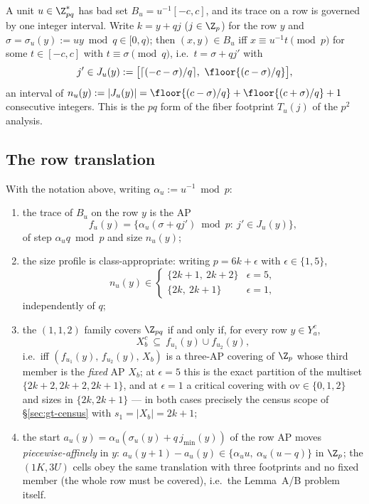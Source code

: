 A unit $u\in\Z_{pq}^{*}$ has bad set $B_u=u^{-1}[-c,c]$, and its trace on a
row is governed by one integer interval. Write $k=y+qj$ ($j\in\Z_p$) for the
row $y$ and $\sigma=\sigma_u(y):=uy\bmod q\in[0,q)$; then
$(x,y)\in B_u$ iff $x\equiv u^{-1}t\pmod p$ for some $t\in[-c,c]$ with
$t\equiv\sigma\pmod q$, i.e.\ $t=\sigma+qj'$ with
\begin{equation}\label{eq:Jinterval}
j'\in J_u(y):=\bigl[\lceil(-c-\sigma)/q\rceil,\ \floor{(c-\sigma)/q}\bigr],
\end{equation}
an interval of $n_u(y):=|J_u(y)|=\floor{(c-\sigma)/q}+\floor{(c+\sigma)/q}+1$
consecutive integers. This is the $pq$ form of the fiber footprint
$T_u(j)$ of the $p^2$ analysis.

\subsection{The row translation}\label{sec:pq-thm}

\begin{theorem}[row translation at $N=pq$]\label{thm:R}
With the notation above, writing $\alpha_u:=u^{-1}\bmod p$:
\begin{enumerate}[leftmargin=1.9em,itemsep=2pt]
\item[\textup{(i)}] the trace of $B_u$ on the row $y$ is the AP
\[
f_u(y)=\{\alpha_u(\sigma+qj')\bmod p:\ j'\in J_u(y)\},
\]
of step $\alpha_u q\bmod p$ and size $n_u(y)$;
\item[\textup{(ii)}] the size profile is class-appropriate: writing
$p=6k+\epsilon$ with $\epsilon\in\{1,5\}$,
\[
n_u(y)\in
\begin{cases}
\{2k+1,\ 2k+2\}&\epsilon=5,\\
\{2k,\ 2k+1\}&\epsilon=1,
\end{cases}
\]
independently of $q$;
\item[\textup{(iii)}] the $(1,1,2)$ family covers $\Z_{pq}$ if and only if,
for every row $y\in Y_a^{c}$,
\[
X_b^{c}\ \subseteq\ f_{u_1}(y)\cup f_{u_2}(y),
\]
i.e.\ iff $(f_{u_1}(y),\,f_{u_2}(y),\,X_b)$ is a three-AP covering of
$\Z_p$ whose third member is the \emph{fixed} AP $X_b$; at $\epsilon=5$ this
is the exact partition of the multiset $\{2k{+}2,2k{+}2,2k{+}1\}$, and at
$\epsilon=1$ a critical covering with $\mathrm{ov}\in\{0,1,2\}$ and sizes in
$\{2k,2k{+}1\}$ --- in both cases precisely the census scope of
\S\ref{sec:gt-census} with $s_1=|X_b|=2k+1$;
\item[\textup{(iv)}] the start $a_u(y)=\alpha_u(\sigma_u(y)+q\,j_{\min}(y))$
of the row AP moves \emph{piecewise-affinely} in $y$:
$a_u(y{+}1)-a_u(y)\in\{\alpha_u u,\ \alpha_u(u-q)\}$ in $\Z_p$; the
$(1K,3U)$ cells obey the same translation with three footprints and no fixed
member (the whole row must be covered), i.e.\ the Lemma~A/B problem itself.
\end{enumerate}
\end{theorem}

